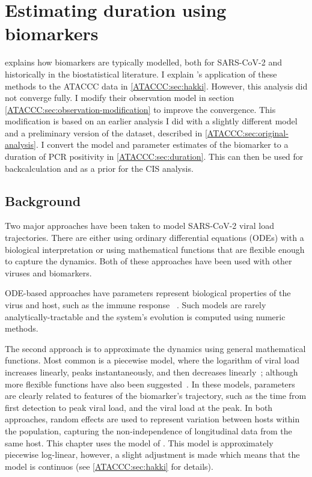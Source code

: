 \documentclass[thesis.tex]{subfiles}
\begin{document}
\ifSubfilesClassLoaded{
  \setcounter{chapter}{4}
}

\chapter{Estimating duration using biomarkers} \label{ATACCC}


 explains how biomarkers are typically modelled, both for SARS-CoV-2 and historically in the biostatistical literature.
I explain \textcite{hakkiOnset}'s application of these methods to the ATACCC data in \cref{ATACCC:sec:hakki}.
However, this analysis did not converge fully.
I modify their observation model in section \cref{ATACCC:sec:observation-modification} to improve the convergence.
This modification is based on an earlier analysis I did with a slightly different model and a preliminary version of the dataset, described in \cref{ATACCC:sec:original-analysis}.
I convert the model and parameter estimates of the biomarker to a duration of PCR positivity in \cref{ATACCC:sec:duration}.
This can then be used for backcalculation and as a prior for the CIS analysis.

\section{Background} \label{ATACCC:sec:background}

Two major approaches have been taken to model SARS-CoV-2 viral load trajectories.
There are either using ordinary differential equations (ODEs) with a biological interpretation or using mathematical functions that are flexible enough to capture the dynamics.
Both of these approaches have been used with other viruses and biomarkers.

ODE-based approaches have parameters represent biological properties of the virus and host, such as the immune response ~\autocites[e.g.:][]{ejimaEstimation,keVivo,kimQuantitative,goncalvesTiming,perelsonMechanistic}.
Such models are rarely analytically-tractable and the system's evolution is computed using numeric methods.

The second approach is to approximate the dynamics using general mathematical functions.
Most common is a piecewise model, where the logarithm of viral load increases linearly, peaks instantaneously, and then decreases linearly~\autocites{clearyUsing,kisslerViral,larremoreTest}; although more flexible functions have also been suggested~\autocites{quiltyQuarantine}.
In these models, parameters are clearly related to features of the biomarker's trajectory, such as the time from first detection to peak viral load, and the viral load at the peak.
In both approaches, random effects are used to represent variation between hosts within the population, capturing the non-independence of longitudinal data from the same host.
This chapter uses the model of \textcite{hakkiOnset}.
This model is approximately piecewise log-linear, however, a slight adjustment is made which means that the model is continuos (see \cref{ATACCC:sec:hakki} for details).
\end{document}
